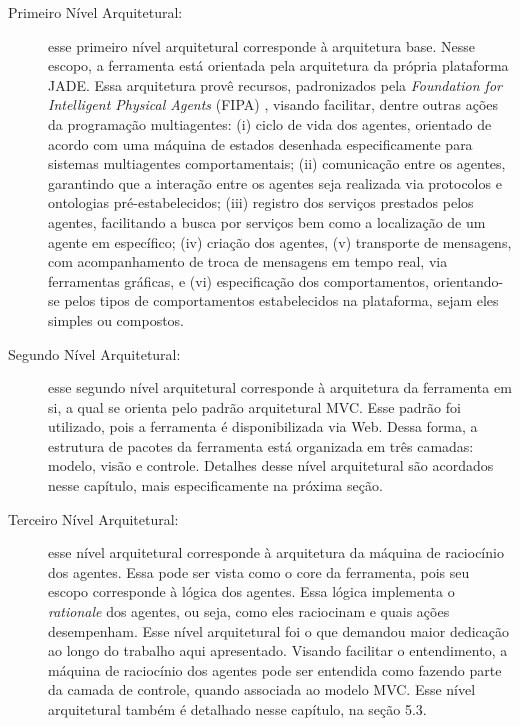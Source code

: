 \begin{description}
\item[Primeiro Nível Arquitetural:]
esse primeiro nível arquitetural corresponde à arquitetura base. Nesse escopo, a ferramenta está orientada pela arquitetura da própria plataforma JADE. Essa arquitetura provê recursos, padronizados pela \textit{Foundation for Intelligent Physical Agents} (FIPA) \cite{telecon2014}, visando facilitar, dentre outras ações da programação multiagentes: (i) ciclo de vida dos agentes, orientado de acordo com uma máquina de estados desenhada especificamente para sistemas multiagentes comportamentais; (ii) comunicação entre os agentes, garantindo que a interação entre os agentes seja realizada via protocolos e ontologias pré-estabelecidos; (iii) registro dos serviços prestados pelos agentes, facilitando a busca por serviços bem como a localização de um agente em específico; (iv) criação dos agentes, (v) transporte de mensagens, com acompanhamento de troca de mensagens em tempo real, via ferramentas gráficas, e (vi) especificação dos comportamentos, orientando-se pelos tipos de comportamentos estabelecidos na plataforma, sejam eles simples ou compostos.

\item[Segundo Nível Arquitetural:]
esse segundo nível arquitetural corresponde à arquitetura da ferramenta em si, a qual se orienta pelo padrão arquitetural MVC. Esse padrão foi utilizado, pois a ferramenta é disponibilizada via Web. Dessa forma, a estrutura de pacotes da ferramenta está organizada em três camadas: modelo, visão e controle. Detalhes desse nível arquitetural são acordados nesse capítulo, mais especificamente na próxima seção.

\item[Terceiro Nível Arquitetural:]
esse nível arquitetural corresponde à arquitetura da máquina de raciocínio dos agentes. Essa pode ser vista como o core da ferramenta, pois seu escopo corresponde à lógica dos agentes. Essa lógica implementa o \textit{rationale} dos agentes, ou seja, como eles raciocinam e quais ações desempenham. Esse nível arquitetural foi o que demandou maior dedicação ao longo do trabalho aqui apresentado. Visando facilitar o entendimento, a máquina de raciocínio dos agentes pode ser entendida como fazendo parte da camada de controle, quando associada ao modelo MVC. Esse nível arquitetural também é detalhado nesse capítulo, na seção 5.3.

\end{description}

